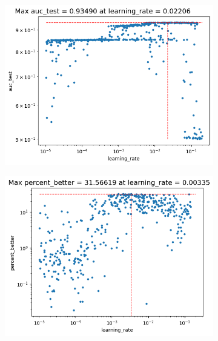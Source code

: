 \documentclass[10pt,a4paper]{article}
\begin{document}
\begin{figure}[H]
\centering
\begin{subfigure}{.5\linewidth}
    \centering
    \includegraphics[width=1\linewidth]{image_2024-01-19_194944584.png}
\end{subfigure}%
\begin{subfigure}{.5\linewidth}
    \centering
    \includegraphics[width=1\linewidth]{image_2024-01-19_235211423.png}
\end{subfigure}
\begin{subfigure}{.5\textwidth}
    \centering

\end{subfigure}
\end{figure}
\end{document}
